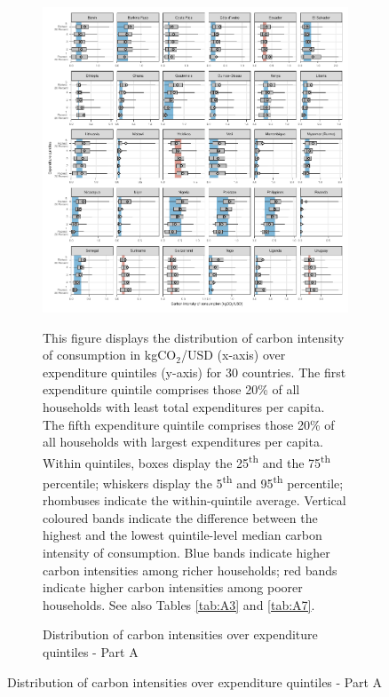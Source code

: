 \begin{figure}[ht!]
  \centering
  \caption{Distribution of carbon intensities over expenditure quintiles} \label{fig:Quint}
  \begin{subfigure}[b]{\textwidth}
  \centering
  \includegraphics{1_Figures/Figures_Appendix/Figure_1_2017_Appendix_1.pdf}
  \caption{Distribution of carbon intensities over expenditure quintiles - Part A} \label{fig:Quint_A}
  \begin{subcaption2}
    This figure displays the distribution of carbon intensity of consumption in kgCO$_{2}$/USD (x-axis) over expenditure quintiles (y-axis) for 30 countries. The first expenditure quintile comprises those 20\% of all households with least total expenditures per capita. The fifth expenditure quintile comprises those 20\% of all households with largest expenditures per capita. Within quintiles, boxes display the 25\textsuperscript{th} and the 75\textsuperscript{th} percentile; whiskers display the 5\textsuperscript{th} and 95\textsuperscript{th} percentile; rhombuses indicate the within-quintile average. Vertical coloured bands indicate the difference between the highest and the lowest quintile-level median carbon intensity of consumption. Blue bands indicate higher carbon intensities among richer households; red bands indicate higher carbon intensities among poorer households. See also Tables \ref{tab:A3} and \ref{tab:A7}.
  \end{subcaption2}
  \end{subfigure}
\end{figure}

